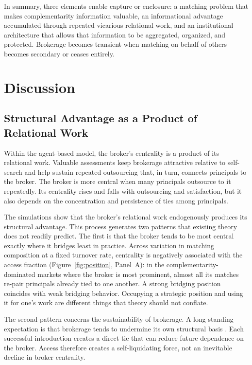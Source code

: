 \documentclass[
]{article}
\begin{document}
In summary, three elements enable capture or enclosure: a matching problem that makes complementarity information valuable, an informational advantage accumulated through repeated vicarious relational work, and an institutional architecture that allows that information to be aggregated, organized, and protected. Brokerage becomes transient when matching on behalf of others becomes secondary or ceases entirely.

\section{Discussion}

\subsection{Structural Advantage as a Product of Relational Work}

Within the agent-based model, the broker's centrality is a product of its relational work. Valuable assessments keep brokerage attractive relative to self-search and help sustain repeated outsourcing that, in turn, connects principals to the broker. The broker is more central when many principals outsource to it repeatedly. Its centrality rises and falls with outsourcing and satisfaction, but it also depends on the concentration and persistence of ties among principals.

The simulations show that the broker's relational work endogenously produces its structural advantage. This process generates two patterns that existing theory does not readily predict. The first is that the broker tends to be most central exactly where it bridges least in practice. Across variation in matching composition at a fixed turnover rate, centrality is negatively associated with the access fraction (Figure~\ref{fig:position}, Panel~A): in the complementarity-dominated markets where the broker is most prominent, almost all its matches re-pair principals already tied to one another. A strong bridging position coincides with weak bridging behavior. Occupying a strategic position and using it for one's work are different things that theory should not conflate.

The second pattern concerns the sustainability of brokerage. A long-standing expectation is that brokerage tends to undermine its own structural basis \autocite{burtStructuralHolesSocial1992,burtBridgeDecay2002a,stovelStabilizingBrokerage2011}. Each successful introduction creates a direct tie that can reduce future dependence on the broker. Access therefore creates a self-liquidating force, not an inevitable decline in broker centrality.
\end{document}
